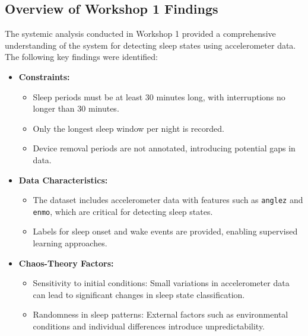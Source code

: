 \documentclass[conference]{IEEEtran}
\begin{document}
    \subsection{Overview of Workshop 1 Findings}
    The systemic analysis conducted in Workshop 1 provided a comprehensive understanding of the system for detecting sleep states using accelerometer data. The following key findings were identified:
    
    \begin{itemize}
        \item \textbf{Constraints:} 
        \begin{itemize}
            \item Sleep periods must be at least 30 minutes long, with interruptions no longer than 30 minutes.
            \item Only the longest sleep window per night is recorded.
            \item Device removal periods are not annotated, introducing potential gaps in data.
        \end{itemize}
        \item \textbf{Data Characteristics:}
        \begin{itemize}
            \item The dataset includes accelerometer data with features such as \texttt{anglez} and \texttt{enmo}, which are critical for detecting sleep states.
            \item Labels for sleep onset and wake events are provided, enabling supervised learning approaches.
        \end{itemize}
        \item \textbf{Chaos-Theory Factors:}
        \begin{itemize}
            \item Sensitivity to initial conditions: Small variations in accelerometer data can lead to significant changes in sleep state classification.
            \item Randomness in sleep patterns: External factors such as environmental conditions and individual differences introduce unpredictability.
        \end{itemize}
    \end{itemize}

    
\end{document}
